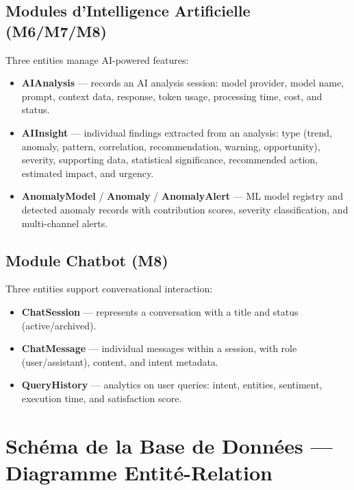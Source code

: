 \subsection{Modules d'Intelligence Artificielle (M6/M7/M8)}

\noindent
Three entities manage AI-powered features:

\begin{itemize}
  \item \textbf{AIAnalysis} — records an AI analysis session:
        model provider, model name, prompt, context data,
        response, token usage, processing time,
        cost, and status.
  \item \textbf{AIInsight} — individual findings extracted
        from an analysis: type (trend, anomaly, pattern,
        correlation, recommendation, warning, opportunity),
        severity, supporting data, statistical significance,
        recommended action, estimated impact, and urgency.
  \item \textbf{AnomalyModel} / \textbf{Anomaly} /
        \textbf{AnomalyAlert} — ML model registry
        and detected anomaly records with contribution scores,
        severity classification, and multi-channel alerts.
\end{itemize}

\subsection{Module Chatbot (M8)}

\noindent
Three entities support conversational interaction:

\begin{itemize}
  \item \textbf{ChatSession} — represents a conversation
        with a title and status (active/archived).
  \item \textbf{ChatMessage} — individual messages
        within a session, with role (user/assistant),
        content, and intent metadata.
  \item \textbf{QueryHistory} — analytics on user queries:
        intent, entities, sentiment, execution time,
        and satisfaction score.
\end{itemize}


\section{Schéma de la Base de Données — Diagramme Entité-Relation}

